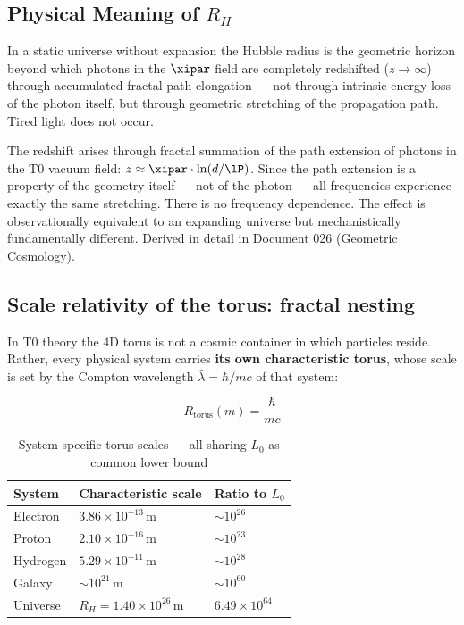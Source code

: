 \subsection{Physical Meaning of \texorpdfstring{$R_H$}{R\_H}}

In a static universe without expansion the Hubble radius is the geometric horizon beyond which photons in the $\xipar$ field are completely redshifted ($z \to \infty$) through accumulated fractal path elongation — not through intrinsic energy loss of the photon itself, but through geometric stretching of the propagation path. Tired light does not occur.

\begin{keypoint}
The redshift arises through fractal summation of the path extension of photons in the T0 vacuum field: $z \approx \xipar \cdot \ln(d/\lP)$. Since the path extension is a property of the geometry itself — not of the photon — all frequencies experience exactly the same stretching. There is no frequency dependence. The effect is observationally equivalent to an expanding universe but mechanistically fundamentally different. Derived in detail in Document 026 (Geometric Cosmology).
\end{keypoint}

\subsection{Scale relativity of the torus: fractal nesting}

In T0 theory the 4D torus is not a cosmic container in which particles reside. Rather, every physical system carries \textbf{its own characteristic torus}, whose scale is set by the Compton wavelength $\bar\lambda = \hbar/mc$ of that system:

\begin{equation}
	R_{\text{torus}}(m) = \frac{\hbar}{mc}
\end{equation}

\begin{table}[h]
\centering
\begin{tabular}{lll}
\toprule
\textbf{System} & \textbf{Characteristic scale} & \textbf{Ratio to $L_0$} \\
\midrule
Electron     & $3{.}86 \times 10^{-13}$\,m & $\sim 10^{26}$ \\
Proton       & $2{.}10 \times 10^{-16}$\,m & $\sim 10^{23}$ \\
Hydrogen     & $5{.}29 \times 10^{-11}$\,m & $\sim 10^{28}$ \\
Galaxy       & $\sim 10^{21}$\,m           & $\sim 10^{60}$ \\
Universe     & $R_H = 1{.}40 \times 10^{26}$\,m & $6{.}49 \times 10^{64}$ \\
\bottomrule
\end{tabular}
\caption{System-specific torus scales — all sharing $L_0$ as common lower bound}
\end{table}


